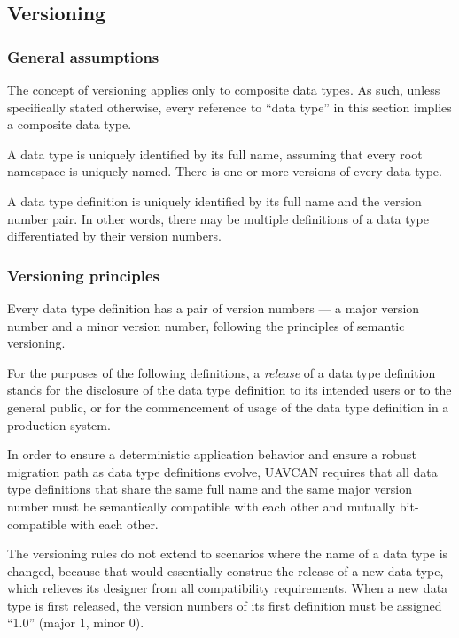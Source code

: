\subsection{Versioning}

\subsubsection{General assumptions}

The concept of versioning applies only to composite data types.
As such, unless specifically stated otherwise, every reference to ``data type''
in this section implies a composite data type.

A data type is uniquely identified by its full name,
assuming that every root namespace is uniquely named.
There is one or more versions of every data type.

A data type definition is uniquely identified by its full name and the version number pair.
In other words, there may be multiple definitions of a data type differentiated by their version numbers.

\subsubsection{Versioning principles}

Every data type definition has a pair of version numbers ---
a major version number and a minor version number, following the principles of semantic versioning.

For the purposes of the following definitions, a \emph{release} of a data type definition stands for
the disclosure of the data type definition to its intended users or to the general public,
or for the commencement of usage of the data type definition in a production system.

In order to ensure a deterministic application behavior and ensure a robust migration path
as data type definitions evolve, UAVCAN requires that all data type definitions that share the same
full name and the same major version number must be semantically compatible with each other
and mutually bit-compatible with each other.

The versioning rules do not extend to scenarios where the name of a data type is changed,
because that would essentially construe the release of a new data type,
which relieves its designer from all compatibility requirements.
When a new data type is first released,
the version numbers of its first definition must be assigned ``1.0'' (major 1, minor 0).

